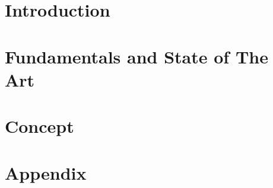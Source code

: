 \documentclass[10pt,twoside]{report}
\title{\thesisTitle}
\author{\thesisAuthor}
\date{\today}
\begin{document}




\tableofcontents{}

\chapter{Introduction}

\chapter{Fundamentals and State of The Art}



\chapter{Concept}

% 
% 
% 

\newpage
\appendix{}
\chapter{Appendix}


\listoffigures{}
\listoftables{}



\newpage
\printglossaries

\nocite{*}
\printbibliography{}

\newpage{}
\end{document}
